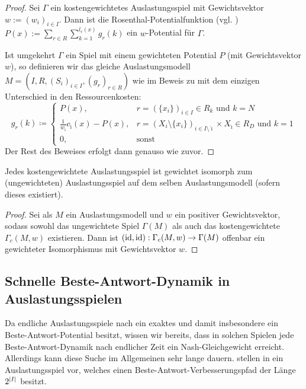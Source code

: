 \begin{proof}
	Sei $\Gamma$ ein kostengewichtetes Auslastungsspiel mit Gewichtsvektor $w := (w_i)_{i\in I}$. Dann ist die Rosenthal-Potentialfunktion (vgl. \cite{RosenthalPotential}) $P(x) := \sum_{r \in R}\sum_{k=1}^{l_r(x)}g_r(k)$ ein $w$-Potential für $\Gamma$.
		
	Ist umgekehrt $\Gamma$ ein Spiel mit einem gewichteten Potential $P$ (mit Gewichtsvektor $w$), so definieren wir das gleiche Auslastungsmodell $M = (I, R, (S_i)_{i \in I}, (g_r)_{r \in R})$ wie im Beweis zu  mit dem einzigen Unterschied in den Ressourcenkosten:
		\[g_r(k) \coloneqq 
		\begin{cases}
		P(x), 									&r = \left(\{x_i\}\right)_{i \in I} \in R_k 													\text{ und } k=N \\
		\frac{1}{w_{\hat{\imath}}}c_{\hat{\imath}}(x) - P(x), 	&r = \left(X_i\setminus\{x_i\}\right)_{i \in I\setminus\hat{\imath}} \times X_{\hat{\imath}} \in R_D 	\text{ und } k=1 \\
		0,										&\text{sonst}
		\end{cases}\]
	Der Rest des Beweises erfolgt dann genauso wie zuvor.
\end{proof}

\begin{lemma}\label{lemma:KostengewAuslIsomZuAusl}
	Jedes kostengewichtete Auslastungsspiel ist gewichtet isomorph zum (ungewichteten) Auslastungsspiel auf dem selben Auslastungsmodell (sofern dieses existiert).
\end{lemma}

\begin{proof}
	Sei als $M$ ein Auslastungsmodell und $w$ ein positiver Gewichtsvektor, sodass sowohl das ungewichtete Spiel $\Gamma(M)$ als auch das kostengewichtete $\Gamma_c(M, w)$ existieren. Dann ist $(\mathrm{id}, \mathrm{id}): \Gamma_c(M,w) \to \Gamma(M)$ offenbar ein gewichteter Isomorphismus mit Gewichtsvektor $w$.
\end{proof}


\subsection{Schnelle Beste-Antwort-Dynamik in Auslastungsspielen}

Da endliche Auslastungsspiele nach  ein exaktes und damit insbesondere ein Beste-Antwort-Potential besitzt, wissen wir bereits, dass in solchen Spielen jede Beste-Antwort-Dynamik nach endlicher Zeit ein Nash-Gleichgewicht erreicht. Allerdings kann diese Suche im Allgemeinen sehr lange dauern. \citeauthor{BAPfadLaengeInAusl} stellen in \cite[Theorem 3.1]{BAPfadLaengeInAusl} ein Auslastungsspiel vor, welches einen Beste-Antwort-Verbesserungspfad der Länge $2^{\left|I\right|}$ besitzt.

